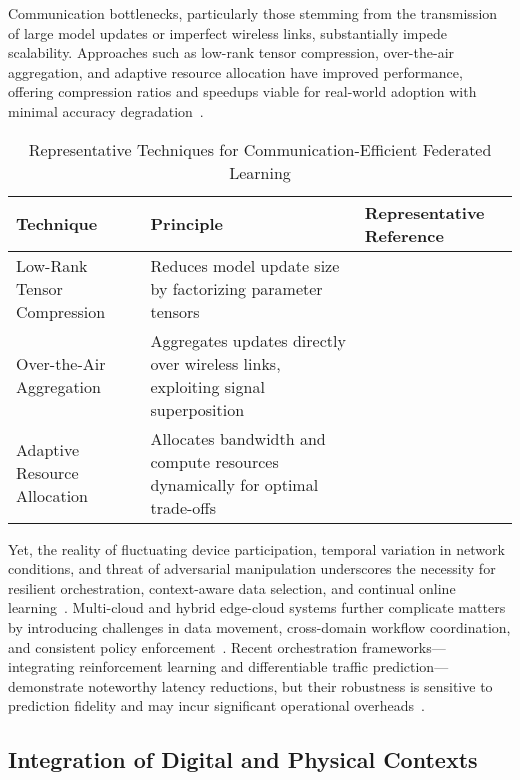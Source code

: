 Communication bottlenecks, particularly those stemming from the transmission of large model updates or imperfect wireless links, substantially impede scalability. Approaches such as low-rank tensor compression, over-the-air aggregation, and adaptive resource allocation have improved performance, offering compression ratios and speedups viable for real-world adoption with minimal accuracy degradation~\cite{ref39,ref42,ref48}. 

\begin{table*}[htbp]
\centering
\caption{Representative Techniques for Communication-Efficient Federated Learning}
\label{tab:fed_techniques}
\begin{adjustbox}{max width=\textwidth}
\begin{tabular}{lll}
\toprule
\textbf{Technique} & \textbf{Principle} & \textbf{Representative Reference} \\
\midrule
Low-Rank Tensor Compression & Reduces model update size by factorizing parameter tensors & \cite{ref39} \\
Over-the-Air Aggregation    & Aggregates updates directly over wireless links, exploiting signal superposition & \cite{ref42} \\
Adaptive Resource Allocation & Allocates bandwidth and compute resources dynamically for optimal trade-offs & \cite{ref48} \\
\bottomrule
\end{tabular}
\end{adjustbox}
\end{table*}

Yet, the reality of fluctuating device participation, temporal variation in network conditions, and threat of adversarial manipulation underscores the necessity for resilient orchestration, context-aware data selection, and continual online learning~\cite{ref25,ref39}. Multi-cloud and hybrid edge-cloud systems further complicate matters by introducing challenges in data movement, cross-domain workflow coordination, and consistent policy enforcement~\cite{ref26,ref48}. Recent orchestration frameworks—integrating reinforcement learning and differentiable traffic prediction—demonstrate noteworthy latency reductions, but their robustness is sensitive to prediction fidelity and may incur significant operational overheads~\cite{ref42}.

\subsection{Integration of Digital and Physical Contexts}

